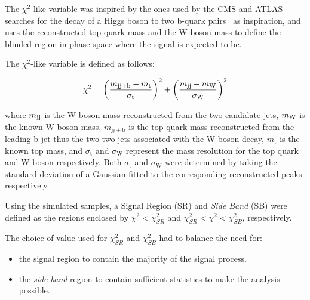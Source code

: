 
The $\chi^{2}$-like variable was inspired by the ones used by the CMS and ATLAS searches for the decay of a Higgs boson to two b-quark pairs~\cite{CMS:2016tlj,TheATLAScollaboration:2016myw} as inspiration, and uses the reconstructed top quark mass and the W boson mass to define the blinded region in phase space where the signal is expected to be.


The $\chi^{2}$-like variable is defined as follows:

\begin{equation}\label{eq:blindingChi2}
   \chi^{2} = {\left(\frac{m_{\mathrm{jj+b}}-m_{\mathrm{t}}}{\sigma_{\mathrm{t}}}\right)}^{2} + {\left(\frac{m_{\rm jj}-m_{\rm W}}{\sigma_{\mathrm{W}}}\right)}^{2}
\end{equation}

where $m_{\rm jj}$ is the W boson mass reconstructed from the two candidate jets, $m_{\rm W}$ is the known W boson mass, $m_{\mathrm{jj+b}}$ is the top quark mass reconstructed from the leading b-jet thus the two two jets associated with the W boson decay, $m_{\mathrm{t}}$ is the known top mass, and $\sigma_{\mathrm{t}}$ and $\sigma_{\mathrm{W}}$ represent the mass resolution for the top quark and W boson respectively.
Both $\sigma_{\mathrm{t}}$ and $\sigma_{\mathrm{W}}$ were determined by taking the standard deviation of a Gaussian fitted to the corresponding reconstructed peaks respectively.

Using the simulated samples, a Signal Region (SR) and \emph{Side Band} (SB) were defined as the regions enclosed by $\chi^{2} < \chi^{2}_{SR}$ and $\chi^{2}_{SR} < \chi^{2} < \chi^{2}_{SB}$, respectively.

The choice of value used for $\chi^{2}_{SR}$ and $\chi^{2}_{SB}$ had to balance the need for:
\begin{itemize}
\item the signal region to contain the majority of the signal process.
\item the \emph{side band} region to contain sufficient statistics to make the analysis possible.
\end{itemize}

